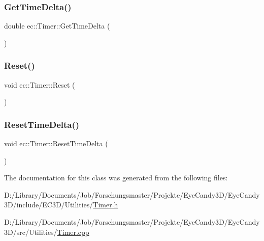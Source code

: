 \mbox{\label{classec_1_1_timer_adae128c90f92cf2dc71dc1095ba60b2f}} 
\subsubsection{\texorpdfstring{Get\+Time\+Delta()}{GetTimeDelta()}}
{\footnotesize\ttfamily double ec\+::\+Timer\+::\+Get\+Time\+Delta (\begin{DoxyParamCaption}{ }\end{DoxyParamCaption})}

\mbox{\label{classec_1_1_timer_a241c38c45185bf51c5b5ac32f4b1f89a}} 
\subsubsection{\texorpdfstring{Reset()}{Reset()}}
{\footnotesize\ttfamily void ec\+::\+Timer\+::\+Reset (\begin{DoxyParamCaption}{ }\end{DoxyParamCaption})}

\mbox{\label{classec_1_1_timer_aef045d450e959956d09a6d816c4ca406}} 
\subsubsection{\texorpdfstring{Reset\+Time\+Delta()}{ResetTimeDelta()}}
{\footnotesize\ttfamily void ec\+::\+Timer\+::\+Reset\+Time\+Delta (\begin{DoxyParamCaption}{ }\end{DoxyParamCaption})}



The documentation for this class was generated from the following files\+:\begin{DoxyCompactItemize}
\item 
D\+:/\+Library/\+Documents/\+Job/\+Forschungsmaster/\+Projekte/\+Eye\+Candy3\+D/\+Eye\+Candy3\+D/include/\+E\+C3\+D/\+Utilities/\mbox{\hyperlink{_timer_8h}{Timer.\+h}}\item 
D\+:/\+Library/\+Documents/\+Job/\+Forschungsmaster/\+Projekte/\+Eye\+Candy3\+D/\+Eye\+Candy3\+D/src/\+Utilities/\mbox{\hyperlink{_timer_8cpp}{Timer.\+cpp}}\end{DoxyCompactItemize}
